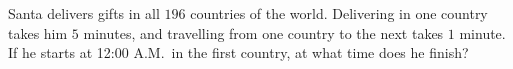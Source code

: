 Santa delivers gifts in all $196$ countries of the world. Delivering in one country takes him $5$ minutes, and travelling from one country to the next takes $1$ minute. If he starts at 12:00 A.M.\ in the first country, at what time does he finish?
